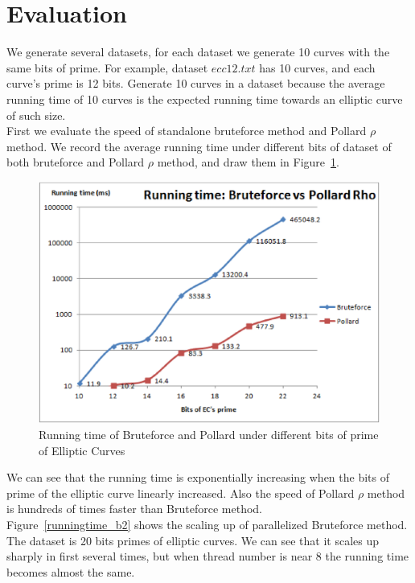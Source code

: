 \documentclass[10pt,a4paper]{article}
\begin{document}
\section{Evaluation}
\indent We generate several datasets, for each dataset we generate 10 curves with the same bits of prime. For example, dataset $ecc12.txt$ has 10 curves, and each curve's prime is 12 bits. Generate 10 curves in a dataset because the average running time of 10 curves is the expected running time towards an elliptic curve of such size. \\   	
\indent First we evaluate the speed of standalone bruteforce method and Pollard $\rho$ method. We record the average running time under different bits of dataset of both bruteforce and Pollard $\rho$ method, and draw them in Figure~\ref{runningtime_b_p}. \\
\begin{figure}
	\centering
    \includegraphics[scale=0.4]{runningtime_b_p.eps}
  	\caption{Running time of Bruteforce and Pollard under different bits of prime of Elliptic Curves}
  	\label{runningtime_b_p}
\end{figure}
\indent We can see that the running time is exponentially increasing when the bits of prime of the elliptic curve linearly increased. Also the speed of Pollard $\rho$ method is hundreds of times faster than Bruteforce method. \\
\indent Figure~\ref{runningtime_b2} shows the scaling up of parallelized Bruteforce method. The dataset is 20 bits primes of elliptic curves. We can see that it scales up sharply in first several times, but when thread number is near 8 the running time becomes almost the same. \\  
\end{document}
